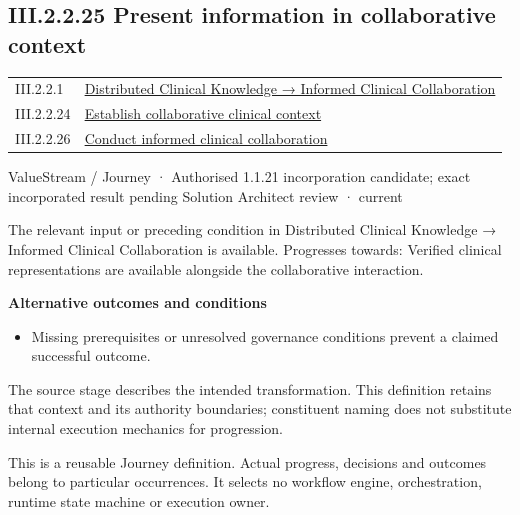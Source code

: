 \subsection*{III.2.2.25 Present information in collaborative context}
\label{navigation:III.2.2.25}

\begin{longtable}{p{.22\linewidth}p{.73\linewidth}}
III.2.2.1 & \hyperref[element:3ba98c0c1170458f8c02fa76694fee67]{Distributed Clinical Knowledge → Informed Clinical Collaboration} \\
III.2.2.24 & \hyperref[element:e453905e7aef4db2aba07de5efc932bc]{Establish collaborative clinical context} \\
III.2.2.26 & \hyperref[element:e53b13570f1945829b753d8d7b427fda]{Conduct informed clinical collaboration} \\
\end{longtable}
\label{element:e0a57481d1d343d48abc3357053576bb}
{\small ValueStream / Journey · Authorised 1.1.21 incorporation candidate; exact incorporated result pending Solution Architect review · current}\par

The relevant input or preceding condition in Distributed Clinical Knowledge → Informed Clinical Collaboration is available. Progresses towards: Verified clinical representations are available alongside the collaborative interaction.



\par\medskip\textbf{Alternative outcomes and conditions}\par


\begin{itemize}


\item Missing prerequisites or unresolved governance conditions prevent a claimed successful outcome.

\end{itemize}


The source stage describes the intended transformation. This definition retains that context and its authority boundaries; constituent naming does not substitute internal execution mechanics for progression.



This is a reusable Journey definition. Actual progress, decisions and outcomes belong to particular occurrences. It selects no workflow engine, orchestration, runtime state machine or execution owner.


